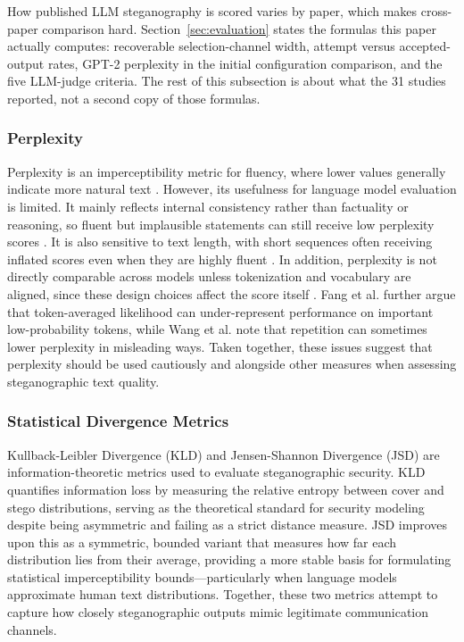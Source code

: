 How published LLM steganography is scored varies by paper, which makes cross-paper comparison hard.
Section~\ref{sec:evaluation} states the formulas this paper actually computes: recoverable selection-channel width, attempt versus accepted-output rates, GPT-2 perplexity in the initial configuration comparison, and the five LLM-judge criteria.
The rest of this subsection is about what the 31 studies reported, not a second copy of those formulas.

\subsubsection{Perplexity}

Perplexity is an imperceptibility metric for fluency, where lower values generally indicate more natural text \cite{jelinek1977perplexity}. However, its usefulness for language model evaluation is limited. It mainly reflects internal consistency rather than factuality or reasoning, so fluent but implausible statements can still receive low perplexity scores \cite{wang2022perplexity}. It is also sensitive to text length, with short sequences often receiving inflated scores even when they are highly fluent \cite{fang2025wrong}. In addition, perplexity is not directly comparable across models unless tokenization and vocabulary are aligned, since these design choices affect the score itself \cite{morgan2024perplexity}. Fang et al. \cite{fang2025wrong} further argue that token-averaged likelihood can under-represent performance on important low-probability tokens, while Wang et al. \cite{wang2022perplexity} note that repetition can sometimes lower perplexity in misleading ways. Taken together, these issues suggest that perplexity should be used cautiously and alongside other measures when assessing steganographic text quality.

\subsubsection{Statistical Divergence Metrics}

Kullback-Leibler Divergence (KLD) \cite{1320776d-9e76-337e-a755-73010b6e4b64} and Jensen-Shannon Divergence (JSD) are information-theoretic metrics used to evaluate steganographic security. KLD quantifies information loss by measuring the relative entropy between cover and stego distributions, serving as the theoretical standard for security modeling despite being asymmetric and failing as a strict distance measure. JSD improves upon this as a symmetric, bounded variant that measures how far each distribution lies from their average, providing a more stable basis for formulating statistical imperceptibility bounds---particularly when language models approximate human text distributions. Together, these two metrics attempt to capture how closely steganographic outputs mimic legitimate communication channels.

